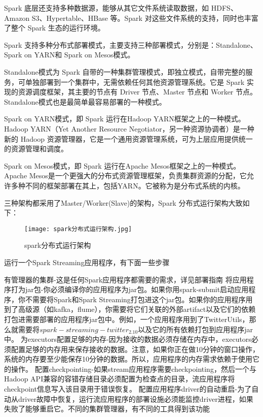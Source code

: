 Spark 底层还支持多种数据源，能够从其它文件系统读取数据，如 HDFS、Amazon S3、Hypertable、HBase 等。Spark 对这些文件系统的支持，同时也丰富了整个 Spark 生态的运行环境。

Spark 支持多种分布式部署模式，主要支持三种部署模式，分别是：Standalone、Spark on YARN和 Spark on Mesos模式。

Standalone模式为 Spark 自带的一种集群管理模式，即独立模式，自带完整的服务，可单独部署到一个集群中，无需依赖任何其他资源管理系统。它是 Spark 实现的资源调度框架，其主要的节点有 Driver 节点、Master 节点和 Worker 节点。Standalone模式也是最简单最容易部署的一种模式。

Spark on YARN模式，即 Spark 运行在Hadoop YARN框架之上的一种模式。Hadoop YARN（Yet Another Resource
Negotiator，另一种资源协调者）是一种新的 Hadoop 资源管理器，它是一个通用资源管理系统，可为上层应用提供统一的资源管理和调度。

Spark on Mesos模式，即 Spark 运行在Apache Mesos框架之上的一种模式。Apache Mesos是一个更强大的分布式资源管理框架，负责集群资源的分配，它允许多种不同的框架部署在其上，包括YARN。它被称为是分布式系统的内核。

三种架构都采用了Master/Worker(Slave)的架构，Spark 分布式运行架构大致如下：
\begin{figure}
    \centering
    \texttt{[image: spark分布式运行架构.jpg]}
    \caption{spark分布式运行架构}
    \label{fig:spark}
  \end{figure}

  运行一个Spark Streaming应用程序，有下面一些步骤

  有管理器的集群-这是任何Spark应用程序都需要的需求，详见部署指南
  将应用程序打为jar包-你必须编译你的应用程序为jar包。如果你用spark-submit启动应用程序，你不需要将Spark和Spark Streaming打包进这个jar包。如果你的应用程序用到了高级源（如kafka，flume），你需要将它们关联的外部artifact以及它们的依赖打包进需要部署的应用程序jar包中。例如，一个应用程序用到了TwitterUtils，那么就需要将$spark-streaming-twitter_2.10$以及它的所有依赖打包到应用程序jar中。
  为executors配置足够的内存-因为接收的数据必须存储在内存中，executors必须配置足够的内存用来保存接收的数据。注意，如果你正在做10分钟的窗口操作，系统的内存要至少能保存10分钟的数据。所以，应用程序的内存需求依赖于使用它的操作。
  配置checkpointing-如果stream应用程序需要checkpointing，然后一个与Hadoop API兼容的容错存储目录必须配置为检查点的目录，流应用程序将checkpoint信息写入该目录用于错误恢复。
  配置应用程序driver的自动重启-为了自动从driver故障中恢复，运行流应用程序的部署设施必须能监控driver进程，如果失败了能够重启它。不同的集群管理器，有不同的工具得到该功能
  
